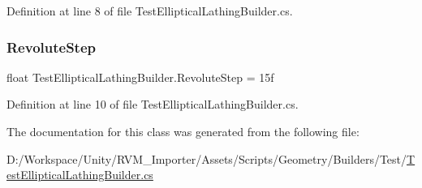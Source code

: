 Definition at line 8 of file Test\+Elliptical\+Lathing\+Builder.\+cs.

\mbox{\label{class_test_elliptical_lathing_builder_a679c335a5fed7101e459c2c03818a5b4}} 
\subsubsection{\texorpdfstring{RevoluteStep}{RevoluteStep}}
{\footnotesize\ttfamily float Test\+Elliptical\+Lathing\+Builder.\+Revolute\+Step = 15f}



Definition at line 10 of file Test\+Elliptical\+Lathing\+Builder.\+cs.



The documentation for this class was generated from the following file\+:\begin{DoxyCompactItemize}
\item 
D\+:/\+Workspace/\+Unity/\+R\+V\+M\+\_\+\+Importer/\+Assets/\+Scripts/\+Geometry/\+Builders/\+Test/\mbox{\hyperlink{_test_elliptical_lathing_builder_8cs}{Test\+Elliptical\+Lathing\+Builder.\+cs}}\end{DoxyCompactItemize}

